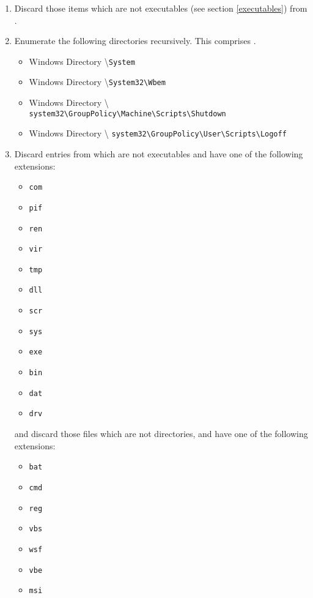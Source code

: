 \begin{enumerate}
\begin{itemize}
    \end{itemize}
    \item Discard those items which are not executables (see section
    \ref{executables}) from .
    \item Enumerate the following directories recursively. This comprises
    .
    \begin{itemize}
        \item Windows Directory \textbackslash \verb|System|
        \item Windows Directory \textbackslash \verb|System32\Wbem|
        \item Windows Directory \textbackslash
        \verb|system32\GroupPolicy\Machine\Scripts\Shutdown|
        \item Windows Directory \textbackslash
        \verb|system32\GroupPolicy\User\Scripts\Logoff|
    \end{itemize}
    \item Discard entries from  which are not executables and have
    one of the following extensions:
    \begin{itemize}
        \item \verb|com|
        \item \verb|pif|
        \item \verb|ren|
        \item \verb|vir|
        \item \verb|tmp|
        \item \verb|dll|
        \item \verb|scr|
        \item \verb|sys|
        \item \verb|exe|
        \item \verb|bin|
        \item \verb|dat|
        \item \verb|drv|
    \end{itemize}
    and discard those files which are not directories, and have one of the
    following extensions:
    \begin{itemize}
        \item \verb|bat|
        \item \verb|cmd|
        \item \verb|reg|
        \item \verb|vbs|
        \item \verb|wsf|
        \item \verb|vbe|
        \item \verb|msi|

\end{itemize}
\end{enumerate}
